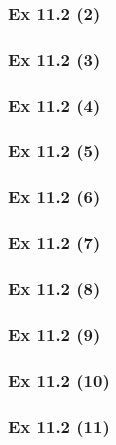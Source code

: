 \subsubsection{Ex 11.2 (2)}\label{sec:Ex_11.2.2}

\subsubsection{Ex 11.2 (3)}\label{sec:Ex_11.2.3}

\subsubsection{Ex 11.2 (4)}\label{sec:Ex_11.2.4}

\subsubsection{Ex 11.2 (5)}\label{sec:Ex_11.2.5}

\subsubsection{Ex 11.2 (6)}\label{sec:Ex_11.2.6}

\subsubsection{Ex 11.2 (7)}\label{sec:Ex_11.2.7}

\subsubsection{Ex 11.2 (8)}\label{sec:Ex_11.2.8}

\subsubsection{Ex 11.2 (9)}\label{sec:Ex_11.2.9}

\subsubsection{Ex 11.2 (10)}\label{sec:Ex_11.2.10}

\newpage		%

\subsubsection{Ex 11.2 (11)}\label{sec:Ex_11.2.11}

